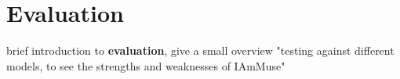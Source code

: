 \chapter{Evaluation}
\label{chapter: evaluation}

brief introduction to \textbf{evaluation}, give a small overview "testing against different models, to see the strengths and weaknesses of IAmMuse"












